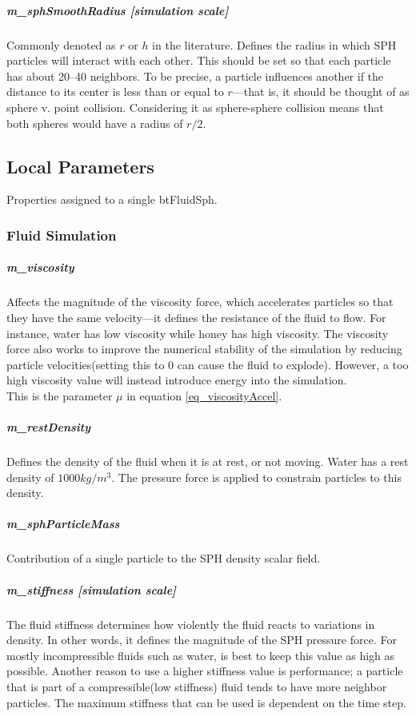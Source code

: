 \documentclass[]{article}
\begin{document}
		\subparagraph{m\_sphSmoothRadius [simulation scale]}
			Commonly denoted as \(r\) or \(h\) in the literature. Defines the radius in which SPH particles will 
			interact with each other. This should be set so that each particle has about 20--40 neighbors. To be precise, 
			a particle influences another if the distance to its center is less than or equal to \(r\)---that is, it 
			should be thought of as sphere v. point collision. Considering it as sphere-sphere collision means that both
			spheres would have a radius of \(r/2\).
		
	\subsection{Local Parameters}
		Properties assigned to a single btFluidSph.

		\subsubsection{Fluid Simulation}
			\subparagraph{m\_viscosity}
				Affects the magnitude of the viscosity force, which accelerates particles so that they have the
				same velocity---it defines the resistance of the fluid to flow. For instance, water has low viscosity while 
				honey has high viscosity. The viscosity force also works to improve the numerical stability of the simulation
				by reducing particle velocities(setting this to 0 can cause the fluid to explode). However, a too high viscosity 
				value will instead introduce energy into the simulation.\\
				
				This is the parameter \(\mu\) in equation \ref{eq_viscosityAccel}.
			
			\subparagraph{m\_restDensity}
				Defines the density of the fluid when it is at rest, or not moving. Water has a rest density
				of \(1000 kg / m^3\). The pressure force is applied to constrain particles to this density.
				
			\subparagraph{m\_sphParticleMass}
				Contribution of a single particle to the SPH density scalar field.
				
			\subparagraph{m\_stiffness [simulation scale]}
				The fluid stiffness determines how violently the fluid reacts to variations in density. In other words, it
				defines the magnitude of the SPH pressure force. For mostly incompressible fluids such as water, is best to
				keep this value as high as possible. Another reason to use a higher stiffness value is performance; a particle
				that is part of a compressible(low stiffness) fluid tends to have more neighbor particles. The maximum stiffness
				that can be used is dependent on the time step.\\
				
\end{document}
